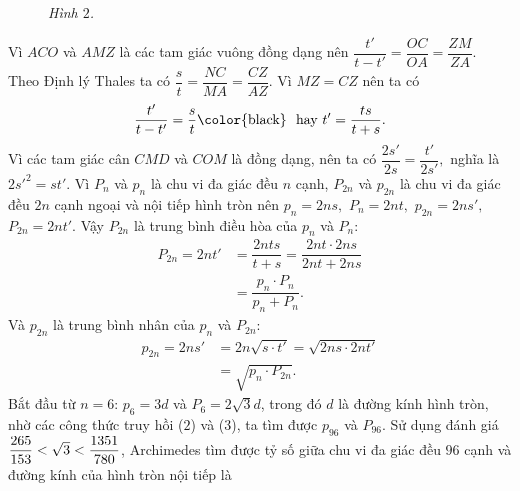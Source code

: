 \begin{multicols}{2}
\begin{figure}[H]
		\caption{\small\textit{\color{lichsutoanhoc}Hình $2$.}}
		\vspace*{-10pt}
	\end{figure}
	Vì $ACO$  và $AMZ$ là các tam giác vuông đồng dạng nên  $\dfrac{{t'}}{{t - t'}} = \dfrac{{OC}}{{OA}} = \dfrac{{ZM}}{{ZA}}.$
	\vskip 0.1cm
	Theo Định lý Thales ta có  $\dfrac{s}{t} = \dfrac{{NC}}{{MA}} = \dfrac{{CZ}}{{AZ}}.$
	\vskip 0.1cm
	Vì $MZ = CZ$ nên ta có 
	\begin{align*}
		\dfrac{{t'}}{{t - t'}} = \dfrac{s}{t} \text{\color{black}\,\, hay } t' = \dfrac{{ts}}{{t + s}}.
	\end{align*}
	Vì các tam giác cân $CMD$  và  $COM$ là đồng dạng, nên ta có $\dfrac{{2s'}}{{2s}} = \dfrac{{t'}}{{2s'}},$  nghĩa là  $2{s'^2} = st'.$
	\vskip 0.1cm
	Vì $P_n$  và $p_n$  là chu vi đa giác đều $n$  cạnh, $P_{2n}$  và $p_{2n}$  là chu vi đa giác đều $2n$  cạnh ngoại và nội tiếp hình tròn nên ${p_n} = 2ns,$ ${P_n} = 2nt,$    ${p_{2n}} = 2ns',$   ${P_{2n}} = 2nt'.$
	\vskip 0.1cm
	Vậy $P_{2n}$   là trung bình điều hòa của  $p_n$ và $P_n$:
	\begin{align*}
		{P_{2n}} = 2nt' &= \dfrac{{2nts}}{{t + s}} = \dfrac{{2nt \cdot 2ns}}{{2nt + 2ns}} \\
		&= \dfrac{{{p_n} \cdot {P_n}}}{{{p_n} + {P_n}}}. \tag{$2$}
	\end{align*}
	Và $p_{2n}$ là trung bình nhân của $p_n$  và $P_{2n}$:  
	\begin{align*}
		{p_{2n}} = 2ns' &= 2n\sqrt {s \cdot t'}  = \sqrt {2ns \cdot 2nt'}  \\
		&= \sqrt {{p_n} \cdot {P_{2n}}} . \tag{$3$}
	\end{align*}
	Bắt đầu từ $n = 6$: $p_6 = 3d$ và $P_6 = 2\sqrt{3}d$,  trong đó $d$  là đường kính hình tròn, nhờ các công thức truy hồi ($2$) và ($3$), ta tìm được  $p_{96}$ và  $P_{96}$. Sử dụng đánh giá $\dfrac{{265}}{{153}}{\rm{ }} < \sqrt 3  < \dfrac{{1351}}{{780}}$,  Archimedes tìm được tỷ số giữa chu vi đa giác đều $96$ cạnh và đường kính của hình tròn nội tiếp là 

\end{multicols}
